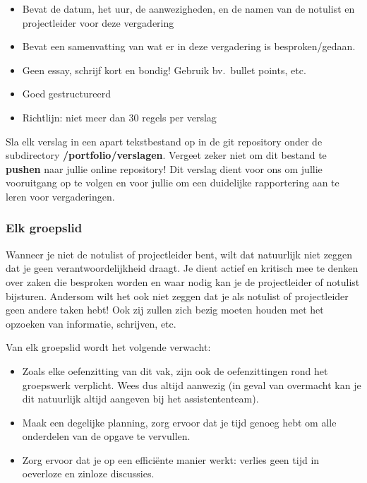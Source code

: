 \documentclass[a4paper]{article}
\begin{document}
\begin{itemize}
	\item Bevat de datum, het uur, de aanwezigheden, en de namen van de notulist en projectleider voor deze vergadering
	\item Bevat een samenvatting van wat er in deze vergadering is besproken/gedaan.
	\item Geen essay, schrijf kort en bondig! Gebruik bv.\ bullet points, etc.
	\item Goed gestructureerd
	\item Richtlijn: niet meer dan 30 regels per verslag
\end{itemize}

Sla elk verslag in een apart tekstbestand op in de git repository onder de subdirectory \textbf{/portfolio/verslagen}.
Vergeet zeker niet om dit bestand te \textbf{pushen} naar jullie online repository!
Dit verslag dient voor ons om jullie vooruitgang op te volgen en voor jullie om een duidelijke rapportering aan te leren voor vergaderingen.


\subsubsection{Elk groepslid}

Wanneer je niet de notulist of projectleider bent, wilt dat natuurlijk niet zeggen dat je geen verantwoordelijkheid draagt.
Je dient actief en kritisch mee te denken over zaken die besproken worden en waar nodig kan je de projectleider of notulist bijsturen.
Andersom wilt het ook niet zeggen dat je als notulist of projectleider geen andere taken hebt!
Ook zij zullen zich bezig moeten houden met het opzoeken van informatie, schrijven, etc.

Van elk groepslid wordt het volgende verwacht:

\begin{itemize}
	\item Zoals elke oefenzitting van dit vak, zijn ook de oefenzittingen rond het groepswerk verplicht. Wees dus altijd aanwezig (in geval van overmacht kan je dit natuurlijk altijd aangeven bij het assistententeam).
	\item Maak een degelijke planning, zorg ervoor dat je tijd genoeg hebt om alle onderdelen van de opgave te vervullen.
	\item Zorg ervoor dat je op een effici\"ente manier werkt: verlies geen tijd in oeverloze en zinloze discussies.
\end{itemize}
\end{document}
